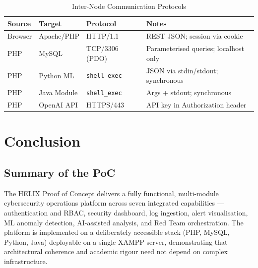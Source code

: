\documentclass[12pt,a4paper]{article}
\begin{document}
\begin{table}[H]
  \centering
  \renewcommand{\arraystretch}{1.25}
  \begin{tabular}{@{}L{3cm} L{3cm} L{2.8cm} p{4.8cm}@{}}
    \toprule
    \textbf{Source} & \textbf{Target} & \textbf{Protocol} & \textbf{Notes} \\
    \midrule
    Browser            & Apache/PHP       & HTTP/1.1               & REST JSON; session via cookie \\
    PHP                & MySQL            & TCP/3306 (PDO)         & Parameterised queries; localhost only \\
    PHP                & Python ML        & \texttt{shell\_exec}   & JSON via stdin/stdout; synchronous \\
    PHP                & Java Module      & \texttt{shell\_exec}   & Args + stdout; synchronous \\
    PHP                & OpenAI API       & HTTPS/443              & API key in Authorization header \\
    \bottomrule
  \end{tabular}
  \caption{Inter-Node Communication Protocols}
\end{table}

\section{Conclusion}

\subsection{Summary of the PoC}
The HELIX Proof of Concept delivers a fully functional, multi-module cybersecurity
operations platform across seven integrated capabilities --- authentication and RBAC,
security dashboard, log ingestion, alert visualisation, ML anomaly detection,
AI-assisted analysis, and Red Team orchestration. The platform is implemented on a
deliberately accessible stack (PHP, MySQL, Python, Java) deployable on a single XAMPP
server, demonstrating that architectural coherence and academic rigour need not depend
on complex infrastructure.
\end{document}
